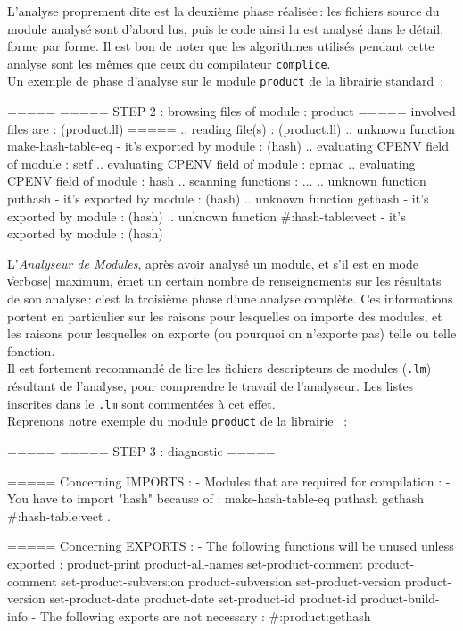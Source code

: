 L'analyse proprement dite est la deuxi\`{e}me phase r\'{e}alis\'{e}e\,: les
fichiers source du module analys\'{e} sont d'abord lus, puis le code ainsi
lu est analys\'{e} dans le d\'{e}tail, forme par forme. Il est bon de noter
que les algorithmes utilis\'{e}s pendant cette analyse sont les m\^{e}mes
que ceux du compilateur {\tt complice}. \\
Un exemple de phase d'analyse sur le module {\tt product} de la
librairie standard \LeLisp\,:

\begin{Longcode*}
=====
===== STEP 2 : browsing files of module : product
=====          involved files are : (product.ll)
=====
.. reading file(s) : (product.ll)
.. unknown function make-hash-table-eq - it's exported by module : (hash)
.. evaluating CPENV field of module : setf
.. evaluating CPENV field of module : cpmac
.. evaluating CPENV field of module : hash
.. scanning functions : ...
.. unknown function puthash - it's exported by module : (hash)
.. unknown function gethash - it's exported by module : (hash)
.. unknown function #:hash-table:vect - it's exported by module : (hash)

\end{Longcode*}


L'{\em Analyseur de Modules}, apr\`{e}s avoir analys\'{e} un module, et s'il
est en mode \|verbose| maximum, \'{e}met un certain nombre de renseignements
sur les r\'{e}sultats de son analyse\,: c'est la troisi\`{e}me phase d'une
analyse compl\`{e}te. Ces informations portent en
particulier sur les raisons pour lesquelles on importe des modules, et
les raisons pour lesquelles on exporte (ou pourquoi on n'exporte pas)
telle ou telle fonction.\\
Il est fortement recommand\'{e} de lire les fichiers descripteurs de
modules ({\tt .lm}) r\'{e}sultant de l'analyse, pour comprendre le travail
de l'analyseur. Les listes inscrites dans le {\tt .lm} sont
comment\'{e}es \`{a} cet effet.\\
Reprenons notre exemple du module {\tt product} de la librairie
\LeLisp\ :

\begin{Longcode*}
=====
===== STEP 3 : diagnostic
=====

===== Concerning IMPORTS :
- Modules that are required for compilation :
- You have to import "hash" because of :
 make-hash-table-eq puthash gethash #:hash-table:vect .

===== Concerning EXPORTS :
- The following functions will be unused unless exported :
     product-print
     product-all-names
     set-product-comment
     product-comment
     set-product-subversion
     product-subversion
     set-product-version
     product-version
     set-product-date
     product-date
     set-product-id
     product-id
     product-build-info
- The following exports are not necessary :
     #:product:gethash

\end{Longcode*}

